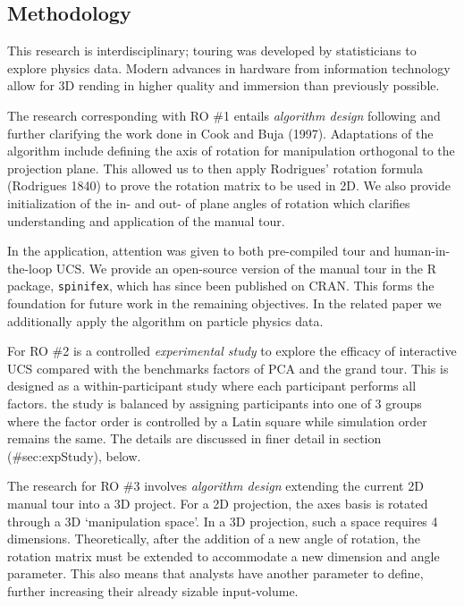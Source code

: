 \documentclass[11,]{article}
\begin{document}
\hypertarget{methodology}{%
\subsection{Methodology}\label{methodology}}

This research is interdisciplinary; touring was developed by statisticians to explore physics data. Modern advances in hardware from information technology allow for 3D rending in higher quality and immersion than previously possible.

The research corresponding with RO \#1 entails \emph{algorithm design} following and further clarifying the work done in Cook and Buja (1997). Adaptations of the algorithm include defining the axis of rotation for manipulation orthogonal to the projection plane. This allowed us to then apply Rodrigues' rotation formula (Rodrigues 1840) to prove the rotation matrix to be used in 2D. We also provide initialization of the in- and out- of plane angles of rotation which clarifies understanding and application of the manual tour.

In the application, attention was given to both pre-compiled tour and human-in-the-loop UCS. We provide an open-source version of the manual tour in the R package, \texttt{spinifex}, which has since been published on CRAN. This forms the foundation for future work in the remaining objectives. In the related paper we additionally apply the algorithm on particle physics data.

For RO \#2 is a controlled \emph{experimental study} to explore the efficacy of interactive UCS compared with the benchmarks factors of PCA and the grand tour. This is designed as a within-participant study where each participant performs all factors. the study is balanced by assigning participants into one of 3 groups where the factor order is controlled by a Latin square while simulation order remains the same. The details are discussed in finer detail in section (\#sec:expStudy), below.

The research for RO \#3 involves \emph{algorithm design} extending the current 2D manual tour into a 3D project. For a 2D projection, the axes basis is rotated through a 3D `manipulation space'. In a 3D projection, such a space requires 4 dimensions. Theoretically, after the addition of a new angle of rotation, the rotation matrix must be extended to accommodate a new dimension and angle parameter. This also means that analysts have another parameter to define, further increasing their already sizable input-volume.
\end{document}
